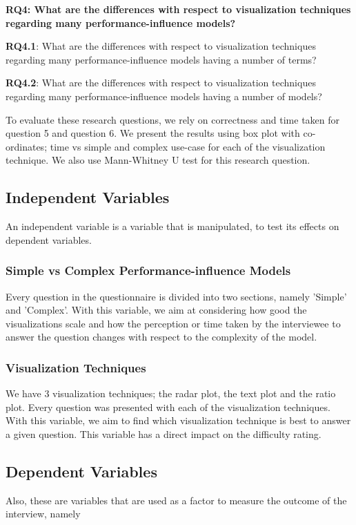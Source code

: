 \textbf{RQ4: What are the differences with respect to visualization techniques regarding many performance-influence models?}

\begin{myindentpar}{0.5cm}
\textbf{RQ4.1}: What are the differences with respect to visualization techniques regarding many performance-influence models having a number of terms?

\textbf{RQ4.2}: What are the differences with respect to visualization techniques regarding many performance-influence models having a number of models?

To evaluate these research questions, we rely on correctness and time taken for question 5 and question 6. We present the results using box plot with co-ordinates; time vs simple and complex use-case for each of the visualization technique. We also use Mann-Whitney U test for this research question.
\end{myindentpar}

\subsection{Independent Variables}
An independent variable is a variable that is manipulated, to test its effects on dependent variables.

\subsubsection*{Simple vs Complex Performance-influence Models}
Every question in the questionnaire is divided into two sections, namely 'Simple' and 'Complex'. With this variable, we aim at considering how good the visualizations scale and how the perception or time taken by the interviewee to answer the question changes with respect to the complexity of the model.

\subsubsection*{Visualization Techniques}
We have 3 visualization techniques; the radar plot, the text plot and the ratio plot. Every question was presented with each of the visualization techniques. With this variable, we aim to find which visualization technique is best to answer a given question. This variable has a direct impact on the difficulty rating.

\subsection{Dependent Variables}
Also, these are variables that are used as a factor to measure the outcome of the interview, namely

